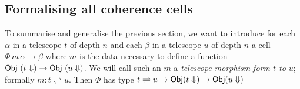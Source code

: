\subsection{Formalising all coherence cells}\label{sec:formalising-coherence}
To summarise and generalise the previous section, we want to introduce
for each $\alpha$ in a telescope $t$ of depth $n$ and each $\beta$ in
a telescope $u$ of depth $n$ a cell $\Phi\,m \,\alpha \longrightarrow
\beta$ where $m$ is the data necessary to define a function
$\mathsf{Obj}~({t}\Downarrow) \rightarrow \mathsf{Obj}~({u}\Downarrow)$. We will call such an $m$
a \emph{telescope morphism form $t$ to $u$}; formally $ m : t
\rightleftharpoons u$. Then $\Phi$ has type $t \rightleftharpoons u
\rightarrow \mathsf{Obj} ({t}\Downarrow) \rightarrow \mathsf{Obj}({u}\Downarrow)$






